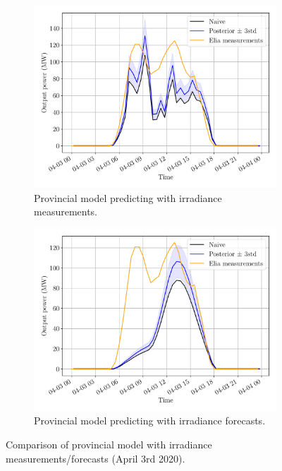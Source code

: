 \documentclass[a4paper, 12pt]{article}
\begin{document}
\begin{figure}[H]
	\centering
	\begin{subfigure}{0.48\textwidth}
		\centering
		\includegraphics[width=\textwidth]{resources/pdf/solar_provincial_meas_meas (START_FOR 03-04-2020).pdf}
		\caption{Provincial model predicting with irradiance measurements.}
		\label{fig:panelwise_meas_meas}
	\end{subfigure}
	\hspace{0.5em}
	\begin{subfigure}{0.48\textwidth}
		\centering
		\includegraphics[width=\textwidth]{resources/pdf/solar_provincial_meas_for (START_FOR 03-04-2020).pdf}
		\caption{Provincial model predicting with irradiance forecasts.}
		\label{fig:panelwise_meas_for}
	\end{subfigure}
	\caption{Comparison of provincial model with irradiance measurements/forecasts (April 3rd 2020).}
	\label{fig:comparison_meas_meas_meas_for_provincial}
\end{figure}
\end{document}
